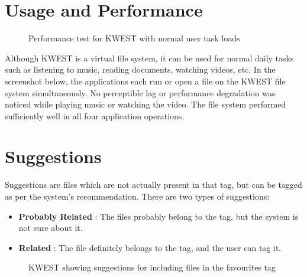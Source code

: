 \section{Usage and Performance}
\begin{figure}[htb]
\centering
\setlength\fboxsep{0pt}
\setlength\fboxrule{0.5pt}
\caption{Performance test for KWEST with normal user task loads}
\label{fig:dfd0}
\end{figure}
Although KWEST is a virtual file system, it can be used for normal daily tasks such as listening to music, reading documents, watching videos, etc. In the screenshot below, the applications each run or open a file on the KWEST file system simultaneously. No perceptible lag or performance degradation was noticed while playing music or watching the video. The file system performed sufficiently well in all four application operations.

\section{Suggestions}
Suggestions are files which are not actually present in that tag, but can be tagged as per the system's recommendation. There are two types of suggestions:
\begin{itemize}
\item \textbf{Probably Related} : The files probably belong to the tag, but the system is not sure about it.
\item \textbf{Related} : The file definitely belongs to the tag, and the user can tag it.
\end{itemize}
\begin{figure}[htb]
\centering
\setlength\fboxsep{0pt}
\setlength\fboxrule{0.5pt}
\caption{KWEST showing suggestions for including files in the favourites tag}
\label{fig:dfd0}
\end{figure}

